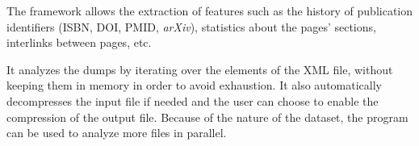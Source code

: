 The framework allows the extraction of features such as the history of publication identifiers (\ac{ISBN}, \ac{DOI}, \ac{PMID}, \emph{arXiv}), statistics about the pages' sections, interlinks between pages, etc.

It analyzes the dumps by iterating over the elements of the XML file, without keeping them in memory in order to avoid exhaustion.
It also automatically decompresses the input file if needed and the user can choose to enable the compression of the output file.
Because of the nature of the dataset, the program can be used to analyze more files in parallel.
